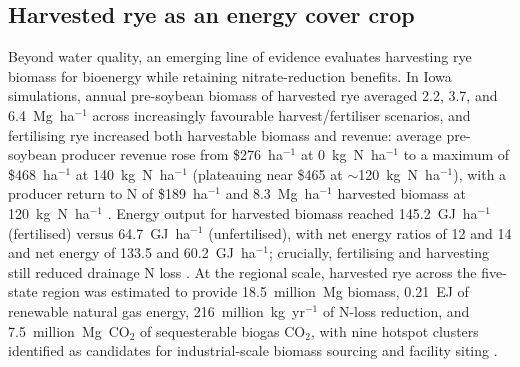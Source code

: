 \documentclass[11pt]{article}
\begin{document}
\subsection{Harvested rye as an energy cover crop}
Beyond water quality, an emerging line of evidence evaluates harvesting rye biomass for bioenergy while retaining nitrate-reduction benefits. In Iowa simulations, annual pre-soybean biomass of harvested rye averaged 2.2, 3.7, and 6.4~Mg~ha$^{-1}$ across increasingly favourable harvest/fertiliser scenarios, and fertilising rye increased both harvestable biomass and revenue: average pre-soybean producer revenue rose from \$276~ha$^{-1}$ at 0~kg~N~ha$^{-1}$ to a maximum of \$468~ha$^{-1}$ at 140~kg~N~ha$^{-1}$ (plateauing near \$465 at $\sim$120~kg~N~ha$^{-1}$), with a producer return to N of \$189~ha$^{-1}$ and 8.3~Mg~ha$^{-1}$ harvested biomass at 120~kg~N~ha$^{-1}$ \parencite{Malone2018}. Energy output for harvested biomass reached 145.2~GJ~ha$^{-1}$ (fertilised) versus 64.7~GJ~ha$^{-1}$ (unfertilised), with net energy ratios of 12 and 14 and net energy of 133.5 and 60.2~GJ~ha$^{-1}$; crucially, fertilising and harvesting still reduced drainage N loss \parencite{Malone2018}. At the regional scale, harvested rye across the five-state region was estimated to provide 18.5~million~Mg biomass, 0.21~EJ of renewable natural gas energy, 216~million~kg~yr$^{-1}$ of N-loss reduction, and 7.5~million~Mg~CO$_2$ of sequesterable biogas CO$_2$, with nine hotspot clusters identified as candidates for industrial-scale biomass sourcing and facility siting \parencite{Malone2023}.
\end{document}
